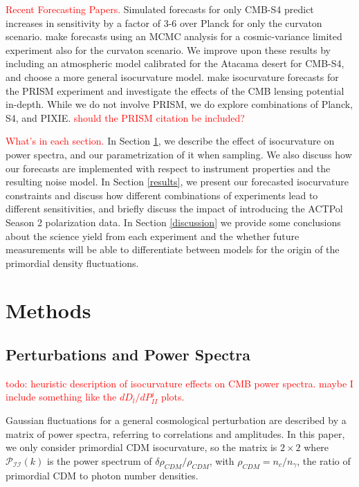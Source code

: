 \documentclass{emulateapj}
\newcommand\writingnote[1]{\textcolor{red}{#1}}
\newcommand\pii{ \mathcal{P}_{\mathcal{I}\mathcal{I}} }
\begin{document}
\writingnote{Recent Forecasting Papers.}
Simulated forecasts for only CMB-S4 \citep{CMB-S4:2016} predict increases in sensitivity by a factor of 3-6 over Planck for only the curvaton scenario. \cite{smith/grin:2016} make forecasts using an MCMC analysis for a cosmic-variance limited experiment also for the curvaton scenario. We improve upon these results by including an atmospheric model calibrated for the Atacama desert for CMB-S4, and choose a more general isocurvature model. \cite{kasanda/moodley:2014} make isocurvature forecasts for the PRISM experiment and investigate the effects of the CMB lensing potential in-depth. While we do not involve PRISM, we do explore combinations of Planck, S4, and PIXIE. \writingnote{should the PRISM citation be included?}

\writingnote{What's in each section.} In Section \ref{methods}, we describe the effect of isocurvature on power spectra, and our parametrization of it when sampling. We also discuss how our forecasts are implemented with respect to instrument properties and the resulting noise model. In Section \ref{results}, we present our forecasted isocurvature constraints and discuss how different combinations of experiments lead to different sensitivities, and briefly discuss the impact of introducing the ACTPol Season 2 polarization data. In Section \ref{discussion} we provide some conclusions about the science yield from each experiment and the whether future measurements will be able to differentiate between models for the origin of the primordial density fluctuations.  


\section{Methods}\label{methods}


\subsection{Perturbations and Power Spectra}\label{powerspectra}

\writingnote{
todo: heuristic description of isocurvature effects on CMB power spectra. maybe I include something like the $dD_l/dP_{II}^j$ plots.
}


Gaussian fluctuations for a general cosmological perturbation are described by a matrix of power spectra, referring to correlations and amplitudes. In this paper, we only consider primordial CDM isocurvature, so the matrix is $2 \times 2$ where $\pii(k)$ is the power spectrum of $\delta \rho_{CDM} / \rho_{CDM}$, with $\rho_{CDM} = n_c / n_{\gamma}$, the ratio of primordial CDM to photon number densities.
\end{document}
